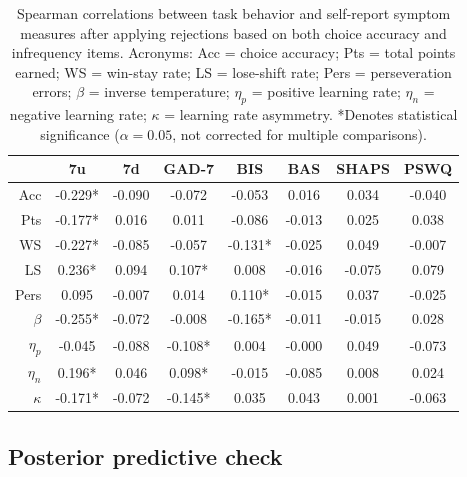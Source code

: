 \documentclass[a4paper,notitlepage,12pt]{article}
\begin{document}
\begin{table}[h!]
\centering
\small
\begin{tabular}{rccccccc}
\toprule
{} &       7u &      7d &    GAD-7 &      BIS &     BAS &   SHAPS &    PSWQ \\
\midrule
Acc      &  -0.229* &  -0.090 &   -0.072 &   -0.053 &   0.016 &   0.034 &  -0.040 \\
Pts      &  -0.177* &   0.016 &    0.011 &   -0.086 &  -0.013 &   0.025 &   0.038 \\
WS       &  -0.227* &  -0.085 &   -0.057 &  -0.131* &  -0.025 &   0.049 &  -0.007 \\
LS       &   0.236* &   0.094 &   0.107* &    0.008 &  -0.016 &  -0.075 &   0.079 \\
Pers     &    0.095 &  -0.007 &    0.014 &   0.110* &  -0.015 &   0.037 &  -0.025 \\
$\beta$  &  -0.255* &  -0.072 &   -0.008 &  -0.165* &  -0.011 &  -0.015 &   0.028 \\
$\eta_p$ &   -0.045 &  -0.088 &  -0.108* &    0.004 &  -0.000 &   0.049 &  -0.073 \\
$\eta_n$ &   0.196* &   0.046 &   0.098* &   -0.015 &  -0.085 &   0.008 &   0.024 \\
$\kappa$ &  -0.171* &  -0.072 &  -0.145* &    0.035 &   0.043 &   0.001 &  -0.063 \\
\bottomrule
\end{tabular}
\captionsetup{width=0.88\textwidth}
\caption{Spearman correlations between task behavior and self-report symptom measures after applying rejections based on both choice accuracy and infrequency items. Acronyms: Acc = choice accuracy; Pts = total points earned; WS = win-stay rate; LS = lose-shift rate; Pers = perseveration errors; $\beta$ = inverse temperature; $\eta_p$ = positive learning rate; $\eta_n$ = negative learning rate; $\kappa$ = learning rate asymmetry. *Denotes statistical significance ($\alpha=0.05$, not corrected for multiple comparisons).}
\end{table}

\subsection*{Posterior predictive check}
\end{document}
